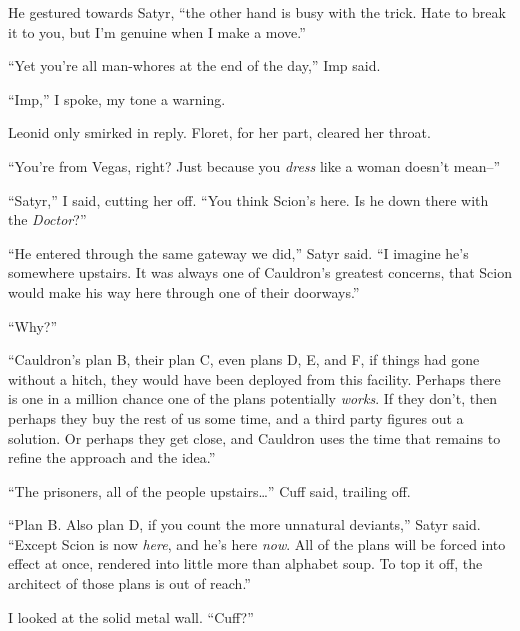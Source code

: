 He gestured towards Satyr, ``\ldotsand the other hand is busy with the trick.  Hate to break it to you, but I'm genuine when I make a move.''



``Yet you're all man-whores at the end of the day,'' Imp said.



``Imp,'' I spoke, my tone a warning.



Leonid only smirked in reply.  Floret, for her part, cleared her throat.



``You're from Vegas, right?  Just because you \emph{dress} like a woman doesn't mean--''



``Satyr,'' I said, cutting her off.  ``You think Scion's here.  Is he down there with the \emph{Doctor}?''



``He entered through the same gateway we did,'' Satyr said.  ``I imagine he's somewhere upstairs.  It was always one of Cauldron's greatest concerns, that Scion would make his way here through one of their doorways.''



``Why?''



``Cauldron's plan B, their plan C, even plans D, E, and F, if things had gone without a hitch, they would have been deployed from this facility.  Perhaps there is one in a million chance one of the plans potentially \emph{works}.  If they don't, then perhaps they buy the rest of us some time, and a third party figures out a solution.  Or perhaps they get close, and Cauldron uses the time that remains to refine the approach and the idea.''



``The prisoners, all of the people upstairs\ldots'' Cuff said, trailing off.



``Plan B.  Also plan D, if you count the more unnatural deviants,'' Satyr said.  ``Except Scion is now \emph{here}, and he's here \emph{now}.  All of the plans will be forced into effect at once, rendered into little more than alphabet soup.  To top it off, the architect of those plans is out of reach.''



I looked at the solid metal wall.  ``Cuff?''



